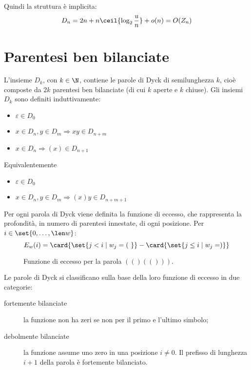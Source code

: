Quindi la struttura è implicita:
\begin{equation*}
	D_n = 2n+n\ceil{\log_2\frac un}+o(n) = O(Z_n)
\end{equation*}



\section{Parentesi ben bilanciate}
L'insieme $D_k$, con $k\in\N$, contiene le parole di Dyck di semilunghezza $k$, cioè composte da $2k$ parentesi ben bilanciate (di cui $k$ aperte e $k$ chiuse). Gli insiemi $D_k$ sono definiti induttivamente:
\begin{itemize}
	\item $\varepsilon\in D_0$
	\item $x\in D_n,y\in D_m\Rightarrow xy\in D_{n+m}$
	\item $x\in D_n\Rightarrow (x)\in D_{n+1}$
\end{itemize}
Equivalentemente
\begin{itemize}
	\item $\varepsilon\in D_0$
	\item $x\in D_n,y\in D_m\Rightarrow (x)y\in D_{n+m+1}$
\end{itemize}

Per ogni parola di Dyck viene definita la funzione di eccesso, che rappresenta la profondità, in numero di parentesi innestate, di ogni posizione. Per $i\in\set{0,\dots,\len w}$:
\begin{equation*}
	E_w(i) = \card{\set{j < i \mid w_j = (~ }} - \card{\set{j\leq i \mid w_j = ) }}
\end{equation*}

\begin{figure}[ht]
	\centering
	
	\caption{Funzione di eccesso per la parola $(()(()))$.}
	\label{fig:func_excess}
\end{figure}

Le parole di Dyck si classificano sulla base della loro funzione di eccesso in due categorie:
\begin{description}
	\item[fortemente bilanciate] la funzione non ha zeri se non per il primo e l'ultimo simbolo;
	\item[debolmente bilanciate] la funzione assume uno zero in una posizione $i\neq0$. Il prefisso di lunghezza $i+1$ della parola è fortemente bilanciato.
\end{description}


